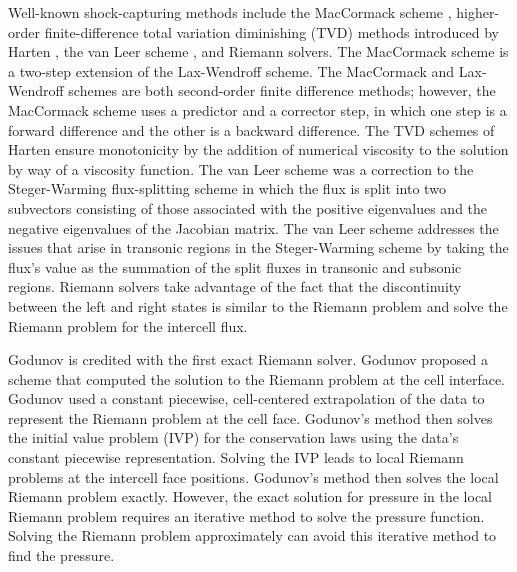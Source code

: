 Well-known shock-capturing methods include the MacCormack scheme \cite{MACCORMACK2003405}, higher-order finite-difference total variation diminishing (TVD) methods introduced by Harten \cite{HARTEN1983357}, the van Leer scheme \cite{VANLEER1997}, and Riemann solvers. The MacCormack scheme is a two-step extension of the Lax-Wendroff \cite{LAXWENDROFF1960132} scheme. The MacCormack and Lax-Wendroff schemes are both second-order finite difference methods; however, the MacCormack scheme uses a predictor and a corrector step, in which one step is a forward difference and the other is a backward difference. The TVD schemes of Harten ensure monotonicity by the addition of numerical viscosity to the solution by way of a viscosity function. The van Leer scheme was a correction to the Steger-Warming \cite{STEGER1981263} flux-splitting scheme in which the flux is split into two subvectors consisting of those associated with the positive eigenvalues and the negative eigenvalues of the Jacobian matrix. The van Leer scheme addresses the issues that arise in transonic regions in the Steger-Warming scheme by taking the flux's value as the summation of the split fluxes in transonic and subsonic regions. Riemann solvers take advantage of the fact that the discontinuity between the left and right states is similar to the Riemann problem and solve the Riemann problem for the intercell flux.

Godunov \cite{godunov:hal-01620642} is credited with the first exact Riemann solver. Godunov proposed a scheme that computed the solution to the Riemann problem at the cell interface. Godunov used a constant piecewise, cell-centered extrapolation of the data to represent the Riemann problem at the cell face. Godunov's method then solves the initial value problem (IVP) for the conservation laws using the data's constant piecewise representation. Solving the IVP leads to local Riemann problems at the intercell face positions. Godunov's method then solves the local Riemann problem exactly. However, the exact solution for pressure in the local Riemann problem requires an iterative method to solve the pressure function. Solving the Riemann problem approximately can avoid this iterative method to find the pressure.

